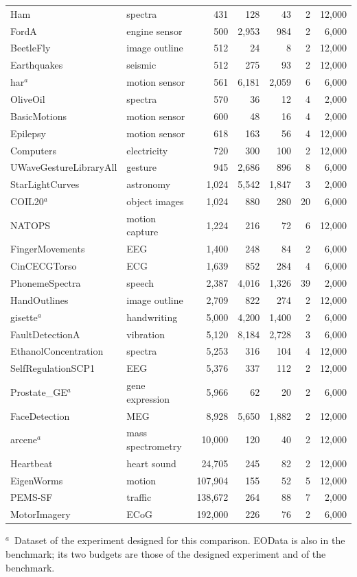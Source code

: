 \begin{table}[!htbp]
\begin{tabular}{@{}>{\raggedright\arraybackslash}p{31mm}lrrrrr@{}}
Ham & spectra & 431 & 128 & 43 & 2 & 12{,}000 \\
FordA & engine sensor & 500 & 2{,}953 & 984 & 2 & 6{,}000 \\
BeetleFly & image outline & 512 & 24 & 8 & 2 & 12{,}000 \\
Earthquakes & seismic & 512 & 275 & 93 & 2 & 12{,}000 \\
har$^{a}$ & motion sensor & 561 & 6{,}181 & 2{,}059 & 6 & 6{,}000 \\
OliveOil & spectra & 570 & 36 & 12 & 4 & 2{,}000 \\
BasicMotions & motion sensor & 600 & 48 & 16 & 4 & 2{,}000 \\
Epilepsy & motion sensor & 618 & 163 & 56 & 4 & 12{,}000 \\
Computers & electricity & 720 & 300 & 100 & 2 & 12{,}000 \\
UWaveGestureLibraryAll & gesture & 945 & 2{,}686 & 896 & 8 & 6{,}000 \\
StarLightCurves & astronomy & 1{,}024 & 5{,}542 & 1{,}847 & 3 & 2{,}000 \\
COIL20$^{a}$ & object images & 1{,}024 & 880 & 280 & 20 & 6{,}000 \\
NATOPS & motion capture & 1{,}224 & 216 & 72 & 6 & 12{,}000 \\
FingerMovements & EEG & 1{,}400 & 248 & 84 & 2 & 6{,}000 \\
CinCECGTorso & ECG & 1{,}639 & 852 & 284 & 4 & 6{,}000 \\
PhonemeSpectra & speech & 2{,}387 & 4{,}016 & 1{,}326 & 39 & 2{,}000 \\
HandOutlines & image outline & 2{,}709 & 822 & 274 & 2 & 12{,}000 \\
gisette$^{a}$ & handwriting & 5{,}000 & 4{,}200 & 1{,}400 & 2 & 6{,}000 \\
FaultDetectionA & vibration & 5{,}120 & 8{,}184 & 2{,}728 & 3 & 6{,}000 \\
EthanolConcentration & spectra & 5{,}253 & 316 & 104 & 4 & 12{,}000 \\
SelfRegulationSCP1 & EEG & 5{,}376 & 337 & 112 & 2 & 12{,}000 \\
Prostate\_GE$^{a}$ & gene expression & 5{,}966 & 62 & 20 & 2 & 6{,}000 \\
FaceDetection & MEG & 8{,}928 & 5{,}650 & 1{,}882 & 2 & 12{,}000 \\
arcene$^{a}$ & mass spectrometry & 10{,}000 & 120 & 40 & 2 & 12{,}000 \\
Heartbeat & heart sound & 24{,}705 & 245 & 82 & 2 & 12{,}000 \\
EigenWorms & motion & 107{,}904 & 155 & 52 & 5 & 12{,}000 \\
PEMS-SF & traffic & 138{,}672 & 264 & 88 & 7 & 2{,}000 \\
MotorImagery & ECoG & 192{,}000 & 226 & 76 & 2 & 6{,}000 \\
\bottomrule
\end{tabular}

\smallskip
\raggedright
$^{a}$~Dataset of the experiment designed for this comparison. EOData is also in the benchmark; its two budgets are those of the designed experiment and of the benchmark.
\end{table}
